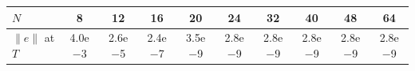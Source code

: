 \begin{tabular}{lccccccccc}
\toprule
$N$ & 8 & 12 & 16 & 20 & 24 & 32 & 40 & 48 & 64 \\
\midrule
$\|e\|$ at $T$ & 4.0e$-$3 & 2.6e$-$5 & 2.4e$-$7 & 3.5e$-$9 & 2.8e$-$9 & 2.8e$-$9 & 2.8e$-$9 & 2.8e$-$9 & 2.8e$-$9 \\
\bottomrule
\end{tabular}

